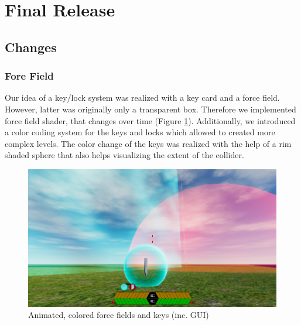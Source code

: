 \documentclass[12pt, letterpaper]{scrartcl}
\begin{document}
	 \newpage
	 \section{Final Release}
	 \subsection{Changes}
	 \subsubsection{Fore Field}
	 Our idea of a key/lock system was realized with a key card and a force field. However, latter was originally only a transparent box. Therefore we implemented force field shader, that changes over time (Figure \ref{fig:forceField}). Additionally, we introduced a color coding system for the keys and locks which allowed to created more complex levels. The color change of the keys was realized with the help of a rim shaded sphere that also helps visualizing the extent of the collider.
	 \begin{figure}[H]
	 	\centering
	 	\includegraphics[width=\textwidth]{images/final/ForceField}
	 	\caption{Animated, colored force fields and keys (inc. GUI)}
	 	\label{fig:forceField}
	 \end{figure}
	 
\end{document}
